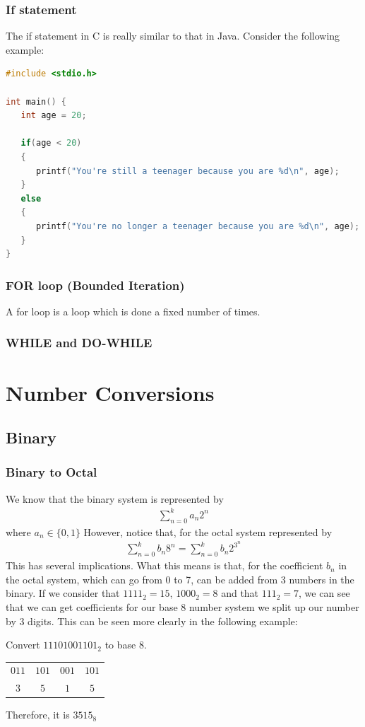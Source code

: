\documentclass[a4paper]{article}
\theoremstyle{plain}
\theoremstyle{definition}
\newtheorem{exmp}{Example}[section]
\theoremstyle{remark}
\begin{document}
\subsubsection{If statement}
The if statement in C is really similar to that in Java. Consider the following example:
\begin{lstlisting}[language = C]
#include <stdio.h>

int main() {
   int age = 20;
   
   if(age < 20)
   { 
      printf("You're still a teenager because you are %d\n", age);
   }
   else
   {
      printf("You're no longer a teenager because you are %d\n", age);
   }
}
\end{lstlisting}
\subsubsection{FOR loop (Bounded Iteration)}
A for loop is a loop which is done a fixed number of times.
\subsubsection{WHILE and DO-WHILE}

\section{Number Conversions}
\subsection{Binary}
\subsubsection{Binary to Octal}
We know that the binary system is represented by
\begin{align*}
	\sum_{n=0}^{k} a_n 2^{n}
\end{align*}
where $a_n \in\{0,1\}$
However, notice that, for the octal system represented by
\begin{align*}
	\sum_{n=0}^{k} b_n 8^n=\sum_{n=0}^{k} b_n 2^{3}^n
\end{align*}
This has several implications. What this means is that, for the coefficient $b_n$ in the octal system, which can go from 0 to 7, can be added from $3$ numbers in the binary. If we consider that $1111_2=15$, $1000_2=8$ and that $111_2 =7$, we can see that we can get coefficients for our base 8 number system we split up our number by 3 digits. This can be seen more clearly in the following example:
\begin{tcolorbox}[colback=black!3!white,colframe=black!60!white,title=\begin{exmp}Conversion 1 \label{Conversion 1}\end{exmp}]
        Convert $11101001101_2$ to base $8$.
	\begin{table}[H]
		\centering
		\label{tab:Conversion}
		\begin{tabular}{c|c|c|c}
		$011$ & $101$ & $001$ & $101$ \\
		$3$ & $5$ & $1$ &  $5$
		\end{tabular}
	\end{table}
		Therefore, it is $3515_8$
\end{tcolorbox}
\end{document}
